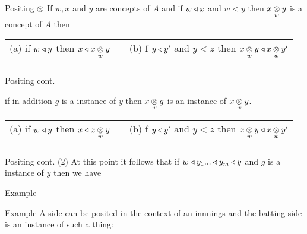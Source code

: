 \begin{frame}{Positing $\cross$}
If $w,x$ and $y$ are concepts of $A$  and if $w \base x$ and $w < y$ then $\crossx{x}{y}{w}$ is a concept of $A$ then
\pause
\begin{tabular} {c p{0.2cm} c}
(a) if $w \base y$ then $x \base \crossx{x}{y}{w}$   &&   (b) f $y \base y'$ and $y <z$ then $ \crossx{x}{y}{w}  \base \crossx{x}{y'}{w}$ \\[0.5cm]
&& \\
\end{tabular}
\end{frame}

\begin{frame} {Positing cont.}

if in addition $g$ is a instance of $y$ then $\crossx{x}{g}{w}$ is an instance of $\crossx{x}{y}{w}$.
\pause
\begin{tabular} {c p{0.2cm} c}
(a) if $w \base y$ then $x \base \crossx{x}{y}{w}$   &&   (b) f $y \base y'$ and $y <z$ then $ \crossx{x}{y}{w}  \base \crossx{x}{y'}{w}$ \\[0.5cm]
&& \\
\end{tabular}
\end{frame}

\begin{frame} {Positing cont. (2)}
At this point it follows that if $w \base y_1 ... \base y_m \base y$ and $g$ is a instance of $y$ then we have


\vspace{0.5cm}
\end{frame}
\begin{frame}{Example}

\end{frame}

\begin{frame}{Example}
A side can be posited in the context of an innnings and the batting side is an instance of such a thing:

\end{frame}



